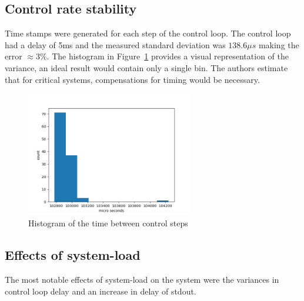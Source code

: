 \documentclass{article}
\begin{document}
\subsection*{Control rate stability}
Time stamps were generated for each step of the control loop.
The control loop had a delay of 5ms and the measured standard deviation was $138.6\mu s$
making the error $\approx 3\%$. The histogram in Figure~\ref{fig:control-hist} provides a
visual representation of the variance, an ideal result would contain only a single bin.
The authors estimate that for critical systems, compensations for timing would be
necessary.
\begin{figure}[h]
    \begin{center}
        \includegraphics[width=0.65\textwidth]{figures/hist1.png}
    \end{center}
    \caption{Histogram of the time between control steps}\label{fig:control-hist}
\end{figure}

\subsection*{Effects of system-load}
The most notable effects of system-load on the system were the variances in control loop
delay and an increase in delay of stdout.

\end{document}
